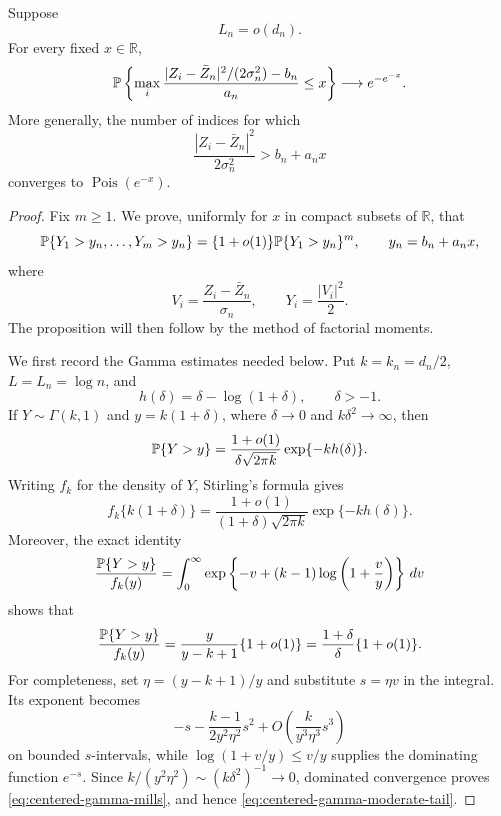 \begin{proposition}
\label{prop:direct-centered-gamma-max}
Suppose
\[
 L_n=o(d_n).
\]
For every fixed \(x\in\mathbb R\),
\begin{equation}
\label{eq:direct-centered-gumbel}
 \mathbb P\left\{
  \max_i
  \frac{|Z_i-\bar Z_n|^2/(2\sigma_n^2)-b_n}{a_n}
  \le x
 \right\}
 \longrightarrow e^{-e^{-x}}.
\end{equation}
More generally, the number of indices for which
\[
 \frac{|Z_i-\bar Z_n|^2}{2\sigma_n^2}>b_n+a_nx
\]
converges to \(\operatorname{Pois}(e^{-x})\).
\end{proposition}

\begin{proof}
Fix \(m\ge1\). We prove, uniformly for \(x\) in compact subsets of
\(\mathbb R\), that
\begin{equation}
\label{eq:centered-joint-tail-factorization}
 \mathbb P\{Y_1>y_n,\ldots,Y_m>y_n\}
 =
 \{1+o(1)\}\mathbb P\{Y_1>y_n\}^m,
 \qquad y_n=b_n+a_nx,
\end{equation}
where
\[
 V_i=\frac{Z_i-\bar Z_n}{\sigma_n},
 \qquad
 Y_i=\frac{|V_i|^2}{2}.
\]
The proposition will then follow by the method of factorial moments.

We first record the Gamma estimates needed below. Put \(k=k_n=d_n/2\),
\(L=L_n=\log n\), and
\[
 h(\delta)=\delta-\log(1+\delta),\qquad \delta>-1.
\]
If \(Y\sim\Gamma(k,1)\) and \(y=k(1+\delta)\), where
\(\delta\to0\) and \(k\delta^2\to\infty\), then
\begin{equation}
\label{eq:centered-gamma-moderate-tail}
 \mathbb P\{Y>y\}
 =
 \frac{1+o(1)}{\delta\sqrt{2\pi k}}
 \exp\{-kh(\delta)\}.
\end{equation}
Writing \(f_k\) for the density of \(Y\), Stirling's formula gives
\[
 f_k\{k(1+\delta)\}
 =
 \frac{1+o(1)}{(1+\delta)\sqrt{2\pi k}}
 \exp\{-kh(\delta)\}.
\]
Moreover, the exact identity
\[
 \frac{\mathbb P\{Y>y\}}{f_k(y)}
 =
 \int_0^\infty
 \exp\left\{-v+(k-1)\log\left(1+\frac{v}{y}\right)\right\}\,dv
\]
shows that
\begin{equation}
\label{eq:centered-gamma-mills}
 \frac{\mathbb P\{Y>y\}}{f_k(y)}
 =
 \frac{y}{y-k+1}\{1+o(1)\}
 =
 \frac{1+\delta}{\delta}\{1+o(1)\}.
\end{equation}
For completeness, set \(\eta=(y-k+1)/y\) and substitute \(s=\eta v\)
in the integral. Its exponent becomes
\[
 -s-\frac{k-1}{2y^2\eta^2}s^2
 +O\left(\frac{k}{y^3\eta^3}s^3\right)
\]
on bounded \(s\)-intervals, while
\(\log(1+v/y)\le v/y\) supplies the dominating function \(e^{-s}\).
Since \(k/(y^2\eta^2)\sim(k\delta^2)^{-1}\to0\), dominated convergence
proves \eqref{eq:centered-gamma-mills}, and hence
\eqref{eq:centered-gamma-moderate-tail}.


\end{proof}
